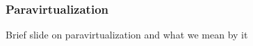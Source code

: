 \begin{frame}
\frametitle{Paravirtualization}

Brief slide on paravirtualization and what we mean by it

\end{frame}
